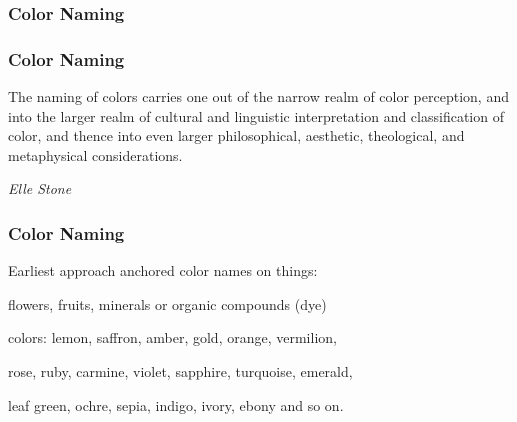 \documentclass[12pt]{beamer}\usepackage[]{graphicx}\usepackage[]{color}
\begin{document}

\begin{frame}
\frametitle{Color Naming}
\begin{center}
\end{center}
\end{frame}


\begin{frame}
\frametitle{Color Naming}

The naming of colors carries one out of the narrow realm of color perception,
and into the larger realm of cultural and linguistic interpretation and 
classification of color, and thence into even larger philosophical, aesthetic,
theological, and metaphysical considerations.
\eb

\textit{Elle Stone}

\end{frame}


\begin{frame}
\frametitle{Color Naming}

\bbi
  \item Earliest approach anchored color names on things:
  \item flowers, fruits, minerals or organic compounds (dye)
  \item colors: lemon, saffron, amber, gold, orange, vermilion, 
  \item rose, ruby, carmine, violet, sapphire, turquoise, emerald, 
  \item leaf green, ochre, sepia, indigo, ivory, ebony and so on. 
\ei

\end{frame}

\end{document}
